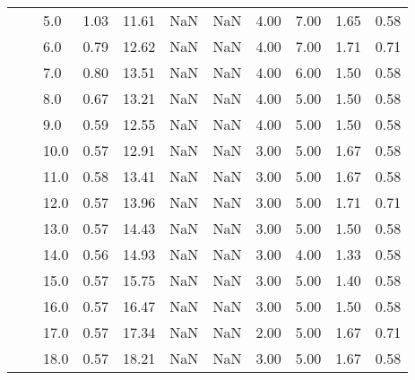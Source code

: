 \begin{tabular}{lllrrrrrrrr}
     &     & 5.0  &      1.03 &      11.61 &               NaN &                NaN & 4.00 &   7.00 &             1.65 &                         0.58 \\
     &     & 6.0  &      0.79 &      12.62 &               NaN &                NaN & 4.00 &   7.00 &             1.71 &                         0.71 \\
     &     & 7.0  &      0.80 &      13.51 &               NaN &                NaN & 4.00 &   6.00 &             1.50 &                         0.58 \\
     &     & 8.0  &      0.67 &      13.21 &               NaN &                NaN & 4.00 &   5.00 &             1.50 &                         0.58 \\
     &     & 9.0  &      0.59 &      12.55 &               NaN &                NaN & 4.00 &   5.00 &             1.50 &                         0.58 \\
     &     & 10.0 &      0.57 &      12.91 &               NaN &                NaN & 3.00 &   5.00 &             1.67 &                         0.58 \\
     &     & 11.0 &      0.58 &      13.41 &               NaN &                NaN & 3.00 &   5.00 &             1.67 &                         0.58 \\
     &     & 12.0 &      0.57 &      13.96 &               NaN &                NaN & 3.00 &   5.00 &             1.71 &                         0.71 \\
     &     & 13.0 &      0.57 &      14.43 &               NaN &                NaN & 3.00 &   5.00 &             1.50 &                         0.58 \\
     &     & 14.0 &      0.56 &      14.93 &               NaN &                NaN & 3.00 &   4.00 &             1.33 &                         0.58 \\
     &     & 15.0 &      0.57 &      15.75 &               NaN &                NaN & 3.00 &   5.00 &             1.40 &                         0.58 \\
     &     & 16.0 &      0.57 &      16.47 &               NaN &                NaN & 3.00 &   5.00 &             1.50 &                         0.58 \\
     &     & 17.0 &      0.57 &      17.34 &               NaN &                NaN & 2.00 &   5.00 &             1.67 &                         0.71 \\
     &     & 18.0 &      0.57 &      18.21 &               NaN &                NaN & 3.00 &   5.00 &             1.67 &                         0.58 \\

\end{tabular}
